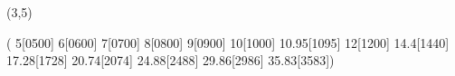 %
%
%
%
%
%
%

\lhvercheck(3,5)

%
     \tablevalues         ( 5[0500] 6[0600] 7[0700] 8[0800] 9[0900]
                           10[1000] 10.95[1095] 12[1200] 14.4[1440]
                           17.28[1728] 20.74[2074] 24.88[2488]
                           29.86[2986] 35.83[3583])

